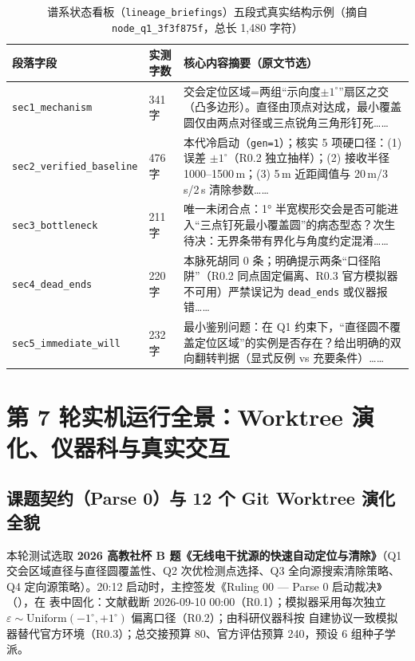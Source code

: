 \documentclass[11pt,a4paper]{ctexart}
\theoremstyle{remark}
\begin{document}
\begin{table}[htbp]
\centering
\caption{谱系状态看板（\texttt{lineage\_briefings}）五段式真实结构示例（摘自 \texttt{node\_q1\_3f3f875f}，总长 1,480 字符）}
\label{tab:briefing_sample}
\small
\begin{tabularx}{\textwidth}{@{}ll>{\raggedright\arraybackslash}X@{}}
\toprule
\textbf{段落字段} & \textbf{实测字数} & \textbf{核心内容摘要（原文节选）} \\
\midrule
\texttt{sec1\_mechanism} & 341 字 & 交会定位区域=两组“示向度$\pm 1^\circ$”扇区之交（凸多边形）。直径由顶点对达成，最小覆盖圆仅由两点对径或三点锐角三角形钉死…… \\
\texttt{sec2\_verified\_baseline} & 476 字 & 本代冷启动（\texttt{gen=1}）；核实 5 项硬口径：(1) 误差 $\pm 1^\circ$（R0.2 独立抽样）；(2) 接收半径 1000--1500\,m；(3) 5\,m 近距阈值与 20\,m/3\,s/2\,s 清除参数…… \\
\texttt{sec3\_bottleneck} & 211 字 & 唯一未闭合点：1° 半宽楔形交会是否可能进入“三点钉死最小覆盖圆”的病态型态？次生待决：无界条带有界化与角度约定混淆…… \\
\texttt{sec4\_dead\_ends} & 220 字 & 本脉死胡同 0 条；明确提示两条“口径陷阱”（R0.2 同点固定偏离、R0.3 官方模拟器不可用）严禁误记为 \texttt{dead\_ends} 或仪器报错…… \\
\texttt{sec5\_immediate\_will} & 232 字 & 最小鉴别问题：在 Q1 约束下，“直径圆不覆盖定位区域”的实例是否存在？给出明确的双向翻转判据（显式反例 vs 充要条件）…… \\
\bottomrule
\end{tabularx}
\end{table}

\section{第 7 轮实机运行全景：Worktree 演化、仪器科与真实交互}

\subsection{课题契约（Parse 0）与 12 个 Git Worktree 演化全貌}
本轮测试选取 \textbf{2026 高教社杯 B 题《无线电干扰源的快速自动定位与清除》}（Q1 交会区域直径与直径圆覆盖性、Q2 次优检测点选择、Q3 全向源搜索清除策略、Q4 定向源策略）。20:12 启动时，主控签发《Ruling 00 — Parse 0 启动裁决》（），在  表中固化：文献截断 2026-09-10 00:00（R0.1）；模拟器采用每次独立 $\varepsilon \sim \mathrm{Uniform}(-1^\circ, +1^\circ)$ 偏离口径（R0.2）；由科研仪器科按  自建协议一致模拟器替代官方环境（R0.3）；总交接预算 80、官方评估预算 240，预设 6 组种子学派。
\end{document}
